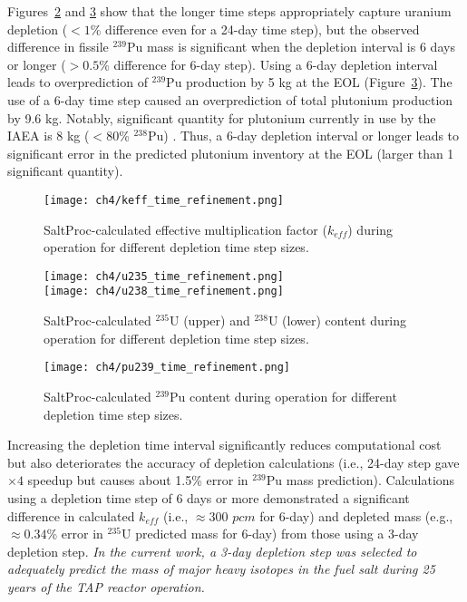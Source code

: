 Figures~\ref{fig:timeref-u} and \ref{fig:timeref-pu239} show that the longer 
time steps appropriately capture uranium depletion ($<1$\% difference even for 
a 24-day time step), but the observed difference in fissile $^{239}$Pu mass is 
significant when the depletion interval is 6 days or longer ($>0.5$\% 
difference for 6-day step). Using a 6-day depletion interval leads to 
overprediction of $^{239}$Pu production by 5 kg at the \gls{EOL} 
(Figure~\ref{fig:timeref-pu239}). The use of a 6-day time step caused an 
overprediction of total plutonium production by 9.6 kg. Notably, 
significant quantity for plutonium currently in use by the IAEA is 8 kg 
($<80$\% $^{238}$Pu) \cite{close_iaea_1995}. Thus, a 6-day depletion interval 
or longer leads to significant error in the predicted plutonium inventory at 
the \gls{EOL} (larger than 1 significant quantity). 
\begin{figure}[hbp!] %
	\centering
	\texttt{[image: ch4/keff\_time\_refinement.png]}
	\caption{SaltProc-calculated effective multiplication factor ($k_{eff}$) 
	during operation for different depletion time step sizes.}
	\label{fig:timeref-keff}
\end{figure}

\begin{figure}[hbp!] %
	\centering
	\texttt{[image: ch4/u235\_time\_refinement.png]}\\
		\vspace{-11mm}
	\hspace{0.5mm}
	\texttt{[image: ch4/u238\_time\_refinement.png]}
		\vspace{-6mm}
	\caption{SaltProc-calculated $^{235}$U (upper) and $^{238}$U (lower) 
	content during operation for different depletion time step sizes.}
	\label{fig:timeref-u}
\end{figure}

\begin{figure}[htp!] %
	\centering
	\texttt{[image: ch4/pu239\_time\_refinement.png]}
	\caption{SaltProc-calculated $^{239}$Pu content during operation for 
		different depletion time step sizes.}
	\label{fig:timeref-pu239}
\end{figure}
Increasing the depletion time interval significantly reduces computational 
cost but also deteriorates the accuracy of depletion calculations (i.e., 
24-day step gave $\times4$ speedup but causes about 1.5\% error in $^{239}$Pu 
mass prediction). Calculations using a depletion time step of 6 days or more 
demonstrated a significant difference in calculated $k_{eff}$ (i.e., 
$\approx300$ $pcm$ for 6-day) and depleted 
mass (e.g., $\approx0.34$\% error in $^{235}$U predicted mass for 6-day) from 
those using a 3-day depletion step. \emph{In the current work, a 3-day 
depletion step was selected to adequately predict the mass of major heavy 
isotopes in the fuel salt during 25 years of the \gls{TAP} reactor operation.}


